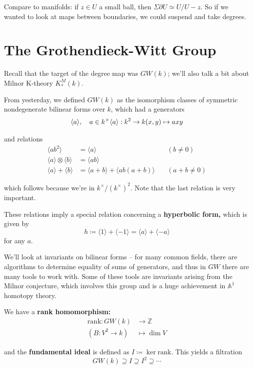 \documentclass[11pt]{scrreprt}
\theoremstyle{definition}
\newcommand{\ZZ}[0]{{\mathbb{Z}}}
\newcommand{\Af}[0]{{\mathbb{A}}}
\newcommand{\generators}[1]{\langle{#1}\rangle}
\newcommand{\tensor}[0]{\otimes}
\newcommand{\del}[0]{{\partial}}
\newcommand{\homotopic}[0]{\simeq}
\newcommand{\definedas}[0]{\coloneqq}
\begin{document}
Compare to manifolds: if \(z\in U\) a small ball, then
\(\Sigma \del U \homotopic U / U - z\). So if we wanted to look at maps
between boundaries, we could suspend and take degrees.

\hypertarget{the-grothendieck-witt-group-1}{%
\section{The Grothendieck-Witt
Group}\label{the-grothendieck-witt-group-1}}

Recall that the target of the degree map was \(GW(k)\); we'll also talk
a bit about Milnor K-theory \(K^M_*(k)\).

From yesterday, we defined \(GW(k)\) as the isomorphism classes of
symmetric nondegenerate bilinear forms over \(k\), which had a
generators \[
\generators{a}, \quad a\in k^\times\\
\generators{a}: k^2 \to k\\
(x,y) \mapsto axy
\]

and relations \begin{align*}
\generators{ab^2} &= \generators{a} \quad&(b\neq 0)\\
\generators{a}\tensor\generators{b} &= \generators{ab} &\\
\generators{a} + \generators b &= \generators{a+b} + \generators{ab(a+b)} \quad&(a+b\neq 0)
\end{align*}

which follows because we're in \(k^\times/(k^\times)^2\). Note that the
last relation is very important.

These relations imply a special relation concerning a \textbf{hyperbolic
form,} which is given by \[
h\definedas \generators {1} + \generators {-1} = \generators a + \generators{-a}
\] for any \(a\).

We'll look at invariants on bilinear forms -- for many common fields,
there are algorithms to determine equality of sums of generators, and
thus in \(GW\) there are many tools to work with. Some of these tools
are invariants arising from the Milnor conjecture, which involves this
group and is a huge achievement in \(\Af^1\) homotopy theory.

We have a \textbf{rank homomorphism:}
\begin{align*}
\text{rank}: GW(k) &\to \ZZ \\
(B: V^2 \to k) &\mapsto \dim V
\end{align*}

and the \textbf{fundamental ideal} is defined as
\(I \definedas \ker \text{rank}\). This yields a filtration \[
GW(k) \supseteq I \supseteq I^2 \supseteq \cdots
\]
\end{document}
